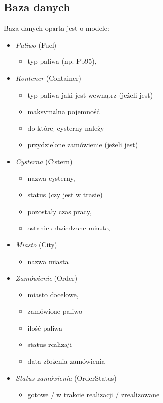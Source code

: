 \documentclass[11pt,a4paper,oneside]{mwart}
\begin{document}
\subsection{Baza danych}
Baza danych oparta jest o modele:
\begin{itemize}
  \item \emph{Paliwo} (Fuel) 
    \begin{itemize}
      \item typ paliwa (np. Pb95),
    \end{itemize}
    \item \emph{Kontener} (Container) 
          \begin{itemize}
            \item typ paliwa jaki jest wewnątrz (jeżeli jest)
            \item maksymalna pojemność
            \item do której cysterny należy
            \item przydzielone zamówienie (jeżeli jest)
    \end{itemize}
      \item \emph{Cysterna} (Cistern) 
            \begin{itemize}
      \item nazwa cysterny,
      \item status (czy jest w trasie)
      \item pozostały czas pracy,
      \item ostanie odwiedzone miasto,
    \end{itemize}
    \item \emph{Miasto} (City)
          \begin{itemize}
      \item nazwa miasta
    \end{itemize}
    \item \emph{Zamówienie} (Order) 
    \begin{itemize}
      \item miasto docelowe,
      \item zamówione paliwo
      \item ilość paliwa
      \item status realizaji
      \item data złożenia zamówienia
    \end{itemize}
    \item \emph{Status zamówienia} (OrderStatus) 
    \begin{itemize}
      \item gotowe / w trakcie realizacji / zrealizowane

\end{itemize}
\end{itemize}
\end{document}
